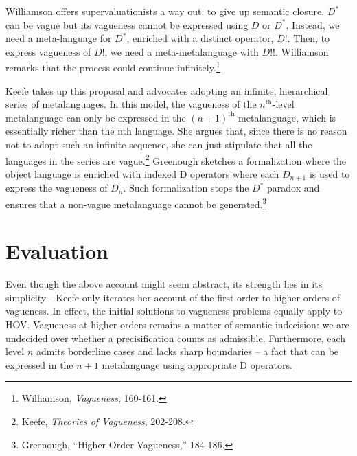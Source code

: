 Williamson offers supervaluationists a way out: to give up semantic
closure. $D^*$ can be vague but its vagueness cannot be expressed using $D$
or $D^*$. Instead, we need a meta-language for $D^*$, enriched with a distinct
operator, $D!$. Then, to express vagueness of $D!$, we need a
meta-metalanguage with $D!!$. Williamson remarks that the process could
continue infinitely.\footnote{Williamson, \emph{Vagueness}, 160-161.}

Keefe takes up this proposal and advocates adopting an infinite,
hierarchical series of metalanguages. In this model, the vagueness of
the $n^{\text{th}}$-level metalanguage can only be expressed in the $(n+1)^{\text{th}}$
metalanguage, which is essentially richer than the nth language. She
argues that, since there is no reason not to adopt such an infinite
sequence, she can just stipulate that all the languages in the series
are vague.\footnote{Keefe, \emph{Theories of Vagueness}, 202-208.}
Greenough sketches a formalization where the object language is enriched
with indexed D operators where each \(D_{n + 1}\) is used to express the
vagueness of \(D_{n}\). Such formalization stops the $D^*$ paradox and
ensures that a non-vague metalanguage cannot be generated.\footnote{Greenough,
  ``Higher-Order Vagueness,'' 184-186.}

\section{Evaluation}

Even though the above account might seem abstract, its strength lies in
its simplicity - Keefe only iterates her account of the first order to
higher orders of vagueness. In effect, the initial solutions to
vagueness problems equally apply to HOV. Vagueness at higher orders
remains a matter of semantic indecision: we are undecided over whether a
precisification counts as admissible. Furthermore, each level $n$
admits borderline cases and lacks sharp boundaries -- a fact that can be
expressed in the $n+1$ metalanguage using appropriate D operators.


